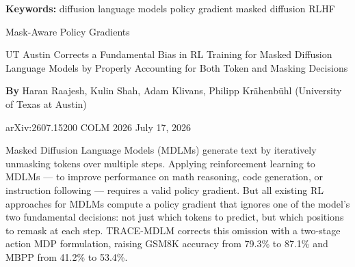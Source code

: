 \documentclass[10pt,twocolumn]{article}
\begin{document}
\setlength{\parindent}{0pt}
\setlength{\parskip}{4pt}

{\small\color{keywordgray}\textbf{Keywords:}
  diffusion language models \textbullet{}
  policy gradient \textbullet{}
  masked diffusion \textbullet{}
  RLHF}\par\vspace{4pt}

{\LARGE\bfseries\raggedright
  Mask-Aware Policy Gradients}\par\vspace{4pt}

{\large\itshape\raggedright
  UT Austin Corrects a Fundamental Bias in RL Training for
  Masked Diffusion Language Models by Properly Accounting
  for Both Token and Masking Decisions}\par\vspace{6pt}

{\small\textbf{By} Haran Raajesh, Kulin Shah, Adam Klivans,
  Philipp Kr\"{a}henb\"{u}hl (University of Texas at
  Austin)}\par\vspace{2pt}

{\small\color{keywordgray}arXiv:2607.15200 \textbullet{}
  COLM 2026 \textbullet{} July 17, 2026}
\par\vspace{2pt}\noindent{\color{rulered}\rule{\columnwidth}{0.6pt}}\vspace{6pt}

Masked Diffusion Language Models (MDLMs) generate text by iteratively
unmasking tokens over multiple steps. Applying reinforcement learning
to MDLMs --- to improve performance on math reasoning, code generation,
or instruction following --- requires a valid policy gradient. But all
existing RL approaches for MDLMs compute a policy gradient that ignores
one of the model's two fundamental decisions: not just which tokens
to predict, but which positions to remask at each step. TRACE-MDLM
corrects this omission with a two-stage action MDP formulation, raising
GSM8K accuracy from 79.3\% to 87.1\% and MBPP from 41.2\% to 53.4\%.
\end{document}
